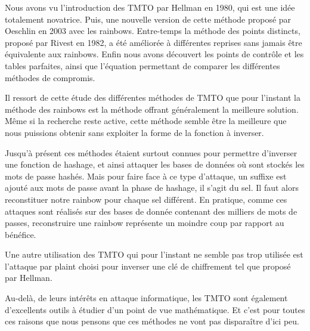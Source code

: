 
	Nous avons vu l'introduction des \gls{TMTO} par Hellman en 1980, qui est une idée totalement novatrice. Puis, une nouvelle version de cette méthode proposé par Oeschlin en 2003 avec les \glspl{rainbow}. Entre-temps la méthode des points distincts, proposé par Rivest en 1982, a été améliorée à différentes reprises sans jamais être équivalente aux \glspl{rainbow}. Enfin nous avons découvert les points de contrôle et les tables parfaites, ainsi que l'équation permettant de comparer les différentes méthodes de compromis.

	\bigskip

	Il ressort de cette étude des différentes méthodes de \gls{TMTO} que pour l'instant la méthode des \glspl{rainbow} est la méthode offrant généralement la meilleure solution. Même si la recherche reste active, cette méthode semble être la meilleure que nous puissions obtenir sans exploiter la forme de la fonction à inverser.

	\bigskip

	Jusqu'à présent ces méthodes étaient surtout connues pour permettre d'inverser une fonction de hashage, et ainsi attaquer les bases de données où sont stockés les mots de passe hashés. Mais pour faire face à ce type d'attaque, un suffixe est ajouté aux mots de passe avant la phase de hashage, il s'agit du sel. Il faut alors reconstituer notre \gls{rainbow} pour chaque sel différent. En pratique, comme ces attaques sont réalisés sur des bases de donnée contenant des milliers de mots de passes, reconstruire une \gls{rainbow} représente un moindre coup par rapport au bénéfice.

	\bigskip

	Une autre utilisation des \gls{TMTO} qui pour l'instant ne semble pas trop utilisée est l'attaque par \gls{plaint} choisi pour inverser une clé de chiffrement tel que proposé par Hellman.

	\bigskip

	Au-delà, de leurs intérêts en attaque informatique, les \gls{TMTO} sont également d'excellents outils à étudier d'un point de vue mathématique. Et c'est pour toutes ces raisons que nous pensons que ces méthodes ne vont pas disparaître d'ici peu. 

\endinput{}

